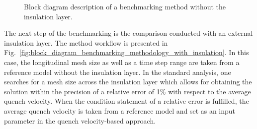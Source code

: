 \begin{figure}[H]
    \caption{Block diagram description of a benchmarking method without the insulation layer.}
    \label{fig:block_diagram_benchmarking_methodology_no_insulation}
\end{figure}

The next step of the benchmarking is the comparison conducted with an external insulation layer. The method workflow is presented in Fig.~\ref{fig:block_diagram_benchmarking_methodology_with_insulation}. In this case, the longitudinal mesh size as well as a time step range are taken from a reference model without the insulation layer. In the standard analysis, one searches for a mesh size across the insulation layer which allows for obtaining the solution within the precision of a relative error of 1\% with respect to the average quench velocity. When the condition statement of a relative error is fulfilled, the average quench velocity is taken from a reference model and set as an input parameter in the quench velocity-based approach. 

